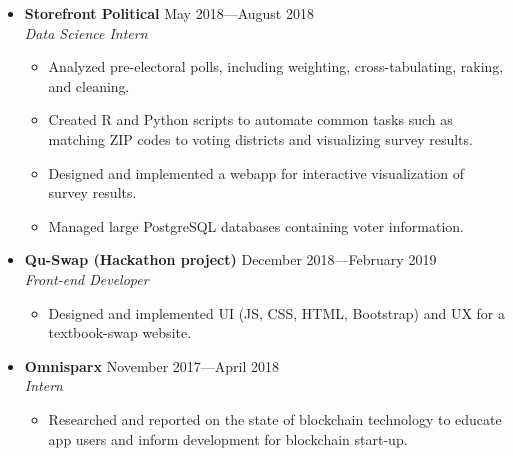 \documentclass[12pt,letterpaper]{article}
\newenvironment{explist}
{\begin{itemize}[label=\textbf{--},itemsep=1pt,topsep=0pt,partopsep=0pt,parsep=0pt]}
{\end{itemize}}
\begin{document}
\begin{itemize}[label=,itemsep=0pt]
	\item
	\textbf{Storefront Political} \hfill May 2018---August 2018\\
	\textit{Data Science Intern}
	\begin{explist}
		\item Analyzed pre-electoral polls, including weighting, cross-tabulating, raking, and cleaning.
		\item Created R and Python scripts to automate common tasks such as matching ZIP codes to voting districts and visualizing survey results.
		\item Designed and implemented a webapp for interactive visualization of survey results.
		\item Managed large PostgreSQL databases containing voter information.
	\end{explist}

	\item
    \textbf{Qu-Swap (Hackathon project)} \hfill December 2018---February 2019\\
	\textit{Front-end Developer}
	\begin{explist}
		\item Designed and implemented UI (JS, CSS, HTML, Bootstrap) and UX for a textbook-swap website.
	\end{explist}
	
    \item
	\textbf{Omnisparx} \hfill November 2017---April 2018\\
	\textit{Intern}
	\begin{explist}
		\item Researched and reported on the state of blockchain technology to educate app users and inform development for blockchain start-up.
	\end{explist}
\end{itemize}
\end{document}
